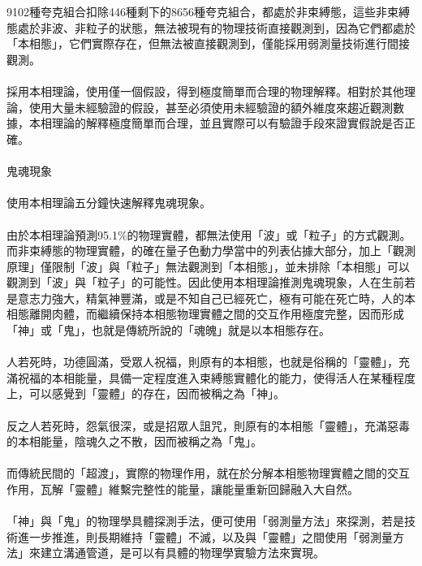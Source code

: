 \documentclass[a4paper,notitlepage,UTF8]{ctexart}
\begin{document}
\\
\\
9102種夸克組合扣除446種剩下的8656種夸克組合，都處於非束縛態，這些非束縛態處於非波、非粒子的狀態，無法被現有的物理技術直接觀測到，因為它們都處於「本相態」，它們實際存在，但無法被直接觀測到，僅能採用弱測量技術進行間接觀測。
\\
\\
採用本相理論，使用僅一個假設，得到極度簡單而合理的物理解釋。相對於其他理論，使用大量未經驗證的假設，甚至必須使用未經驗證的額外維度來趨近觀測數據，本相理論的解釋極度簡單而合理，並且實際可以有驗證手段來證實假說是否正確。
\\
\\
鬼魂現象
\\
\\
使用本相理論五分鐘快速解釋鬼魂現象。
\\
\\
由於本相理論預測95.1\%的物理實體，都無法使用「波」或「粒子」的方式觀測。而非束縛態的物理實體，的確在量子色動力學當中的列表佔據大部分，加上「觀測原理」僅限制「波」與「粒子」無法觀測到「本相態」，並未排除「本相態」可以觀測到「波」與「粒子」的可能性。因此使用本相理論推測鬼魂現象，人在生前若是意志力強大，精氣神豐滿，或是不知自己已經死亡，極有可能在死亡時，人的本相態離開肉體，而繼續保持本相態物理實體之間的交互作用極度完整，因而形成「神」或「鬼」，也就是傳統所說的「魂魄」就是以本相態存在。
\\
\\
人若死時，功德圓滿，受眾人祝福，則原有的本相態，也就是俗稱的「靈體」，充滿祝福的本相能量，具備一定程度進入束縛態實體化的能力，使得活人在某種程度上，可以感覺到「靈體」的存在，因而被稱之為「神」。
\\
\\
反之人若死時，怨氣很深，或是招眾人詛咒，則原有的本相態「靈體」，充滿惡毒的本相能量，陰魂久之不散，因而被稱之為「鬼」。
\\
\\
而傳統民間的「超渡」，實際的物理作用，就在於分解本相態物理實體之間的交互作用，瓦解「靈體」維繫完整性的能量，讓能量重新回歸融入大自然。
\\
\\
「神」與「鬼」的物理學具體探測手法，便可使用「弱測量方法」來探測，若是技術進一步推進，則長期維持「靈體」不滅，以及與「靈體」之間使用「弱測量方法」來建立溝通管道，是可以有具體的物理學實驗方法來實現。
\end{document}

